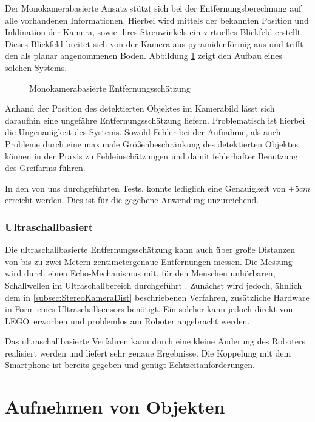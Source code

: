 Der Monokamerabasierte Ansatz stützt sich bei der Entfernungsberechnung auf alle vorhandenen Informationen. Hierbei wird mittels der bekannten Position und Inklination der Kamera, sowie ihres Streuwinkels ein virtuelles Blickfeld erstellt. Dieses Blickfeld breitet sich von der Kamera aus pyramidenförmig aus und trifft den als planar angenommenen Boden. Abbildung \ref{fig:MonokameraEntfernung} zeigt den Aufbau eines solchen Systems. 

\begin{figure}[h]
\centering
\caption{Monokamerabasierte Entfernungsschätzung}
\label{fig:MonokameraEntfernung}
\end{figure}

Anhand der Position des detektierten Objektes im Kamerabild lässt sich daraufhin eine ungefähre Entfernungsschätzung liefern. Problematisch ist hierbei die Ungenauigkeit des Systems. Sowohl Fehler bei der Aufnahme, als auch Probleme durch eine maximale Größenbeschränkung des detektierten Objektes können in der Praxis zu Fehleinschätzungen und damit fehlerhafter Benutzung des Greifarms führen. 

In den von uns durchgeführten Tests, konnte lediglich eine Genauigkeit von $\pm 5cm$ erreicht werden. Dies ist für die gegebene Anwendung unzureichend.

\subsubsection{Ultraschallbasiert}
\label{subsec:Ultraschall}

Die ultraschallbasierte Entfernungsschätzung kann auch über große Distanzen von bis zu zwei Metern zentimetergenaue Entfernungen messen. Die Messung wird durch einen Echo-Mechanismus mit, für den Menschen unhörbaren, Schallwellen im Ultraschallbereich durchgeführt \cite{hertzberg2012mobile}. Zunächst wird jedoch, ähnlich dem in \ref{subsec:StereoKameraDist} beschriebenen Verfahren, zusätzliche Hardware in Form eines Ultraschallsensors benötigt. Ein solcher kann jedoch direkt von LEGO\texttrademark\ erworben und problemlos am Roboter angebracht werden. 

Das ultraschallbasierte Verfahren kann durch eine kleine Änderung des Roboters realisiert werden und liefert sehr genaue Ergebnisse. Die Koppelung mit dem Smartphone ist bereits gegeben und genügt Echtzeitanforderungen.

\section{Aufnehmen von Objekten}
\label{sec:Aufnehmen}

